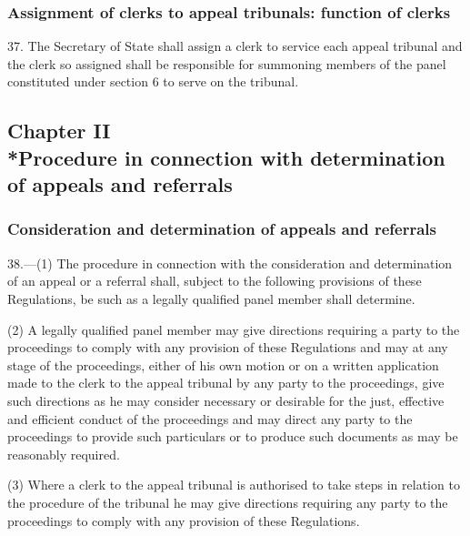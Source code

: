 \documentclass[12pt,a4paper]{article}
\begin{document}

\subsubsection[37. Assignment of clerks to appeal tribunals: function of clerks]{Assignment of clerks to appeal tribunals: function of clerks}

37.  The Secretary of State shall assign a clerk to service each appeal tribunal and the clerk so assigned shall be responsible for summoning members of the panel constituted under section 6 to serve on the tribunal.

\subsection[Chapter II --- Procedure in connection with determination of appeals and referrals]{Chapter II\\*Procedure in connection with determination of appeals and referrals}

\renewcommand\parthead{--- Part V Chapter II}

\subsubsection[38. Consideration and determination of appeals and referrals]{Consideration and determination of appeals and referrals}

38.—(1) The procedure in connection with the consideration and determination of an appeal or a referral shall, subject to the following provisions of these Regulations, be such as a legally qualified panel member shall determine.

(2) A legally qualified panel member may give directions requiring a party to the proceedings to comply with any provision of these Regulations and may at any stage of the proceedings, either of his own motion or on a written application made to the clerk to the appeal tribunal by any party to the proceedings, give such directions as he may consider necessary or desirable for the just, effective and efficient conduct of the proceedings and may direct any party to the proceedings to provide such particulars or to produce such documents as may be reasonably required.

(3) Where a clerk to the appeal tribunal is authorised to take steps in relation to the procedure of the tribunal he may give directions requiring any party to the proceedings to comply with any provision of these Regulations.
\end{document}
